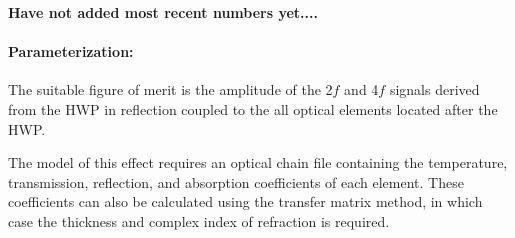 \textbf{Have not added most recent numbers yet....}

\paragraph{Parameterization:}
The suitable figure of merit is the amplitude of the 2$f$ and 4$f$ signals derived from the HWP in reflection coupled to the all optical elements located after the HWP.

The model of this effect requires an optical chain file containing the temperature, transmission, reflection, and absorption coefficients of each element.
These coefficients can also be calculated using the transfer matrix method, in which case the thickness and complex index of refraction is required.
